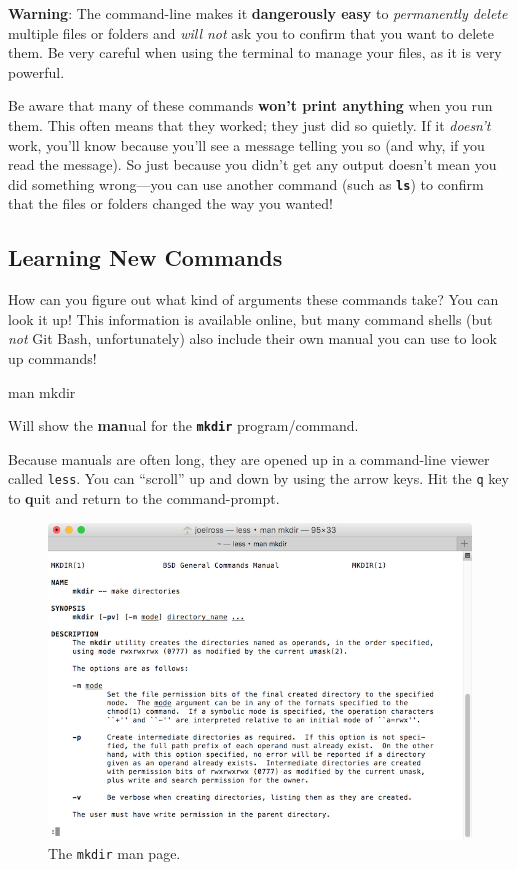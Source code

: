\documentclass[]{book}
\newenvironment{Shaded}{\begin{snugshade}}{\end{snugshade}}
\newcommand{\FunctionTok}[1]{\textcolor[rgb]{0.00,0.00,0.00}{#1}}
\newcommand{\NormalTok}[1]{#1}
\theoremstyle{definition}
\theoremstyle{definition}
\theoremstyle{remark}
\begin{document}
\textbf{Warning}: The command-line makes it \textbf{dangerously easy} to
\emph{permanently delete} multiple files or folders and \emph{will not}
ask you to confirm that you want to delete them. Be very careful when
using the terminal to manage your files, as it is very powerful.

Be aware that many of these commands \textbf{won't print anything} when
you run them. This often means that they worked; they just did so
quietly. If it \emph{doesn't} work, you'll know because you'll see a
message telling you so (and why, if you read the message). So just
because you didn't get any output doesn't mean you did something
wrong---you can use another command (such as \textbf{\texttt{ls}}) to
confirm that the files or folders changed the way you wanted!

\subsection{Learning New Commands}\label{learning-new-commands}

How can you figure out what kind of arguments these commands take? You
can look it up! This information is available online, but many command
shells (but \emph{not} Git Bash, unfortunately) also include their own
manual you can use to look up commands!

\begin{Shaded}
\begin{Highlighting}[]
\FunctionTok{man}\NormalTok{ mkdir}
\end{Highlighting}
\end{Shaded}

Will show the \textbf{man}ual for the \textbf{\texttt{mkdir}}
program/command.

Because manuals are often long, they are opened up in a command-line
viewer called \texttt{less}. You can ``scroll'' up and down by using the
arrow keys. Hit the \texttt{q} key to \textbf{q}uit and return to the
command-prompt.

\begin{figure}
\centering
\includegraphics{img/command-line/mkdir.png}
\caption{The \texttt{mkdir} man page.}
\end{figure}
\end{document}
